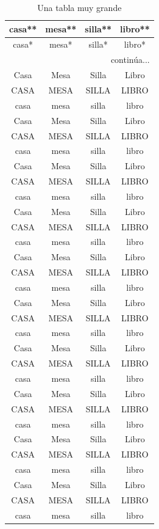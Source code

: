 \documentclass{report}
\begin{document}
\begin{longtable}[c]{c|c|c|c}
	\caption{Una tabla muy grande}\\
	\hline
	casa** & mesa** & silla** & libro**\\
	\endfirsthead
	casa* & mesa* & silla* & libro* \\
	\hline
	\endhead
	\multicolumn{4}{r}{continúa...}
	\endfoot	
	\multicolumn{4}{r}{fin}
	\endlastfoot
	casa & mesa & silla & libro \\
	Casa & Mesa & Silla & Libro \\
	CASA & MESA & SILLA & LIBRO \\
	casa & mesa & silla & libro \\
	\pagebreak
	Casa & Mesa & Silla & Libro \\
	CASA & MESA & SILLA & LIBRO \\
	casa & mesa & silla & libro \\
	Casa & Mesa & Silla & Libro \\
	CASA & MESA & SILLA & LIBRO \\
	casa & mesa & silla & libro \\
	Casa & Mesa & Silla & Libro \\
	CASA & MESA & SILLA & LIBRO \\
	casa & mesa & silla & libro \\
	Casa & Mesa & Silla & Libro \\
	CASA & MESA & SILLA & LIBRO \\
	casa & mesa & silla & libro \\
	Casa & Mesa & Silla & Libro \\
	CASA & MESA & SILLA & LIBRO \\
	casa & mesa & silla & libro \\
	Casa & Mesa & Silla & Libro \\
	CASA & MESA & SILLA & LIBRO \\
	casa & mesa & silla & libro \\
	Casa & Mesa & Silla & Libro \\
	CASA & MESA & SILLA & LIBRO \\
	casa & mesa & silla & libro \\
	Casa & Mesa & Silla & Libro \\
	CASA & MESA & SILLA & LIBRO \\
	casa & mesa & silla & libro \\
	Casa & Mesa & Silla & Libro \\
	CASA & MESA & SILLA & LIBRO \\
	casa & mesa & silla & libro \\

\end{longtable}
\end{document}
